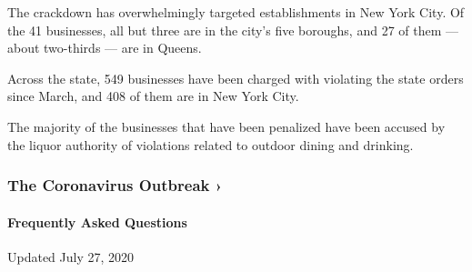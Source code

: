 The crackdown has overwhelmingly targeted establishments in New York
City. Of the 41 businesses, all but three are in the city's five
boroughs, and 27 of them --- about two-thirds --- are in Queens.

Across the state, 549 businesses have been charged with violating the
state orders since March, and 408 of them are in New York City.

The majority of the businesses that have been penalized have been
accused by the liquor authority of violations related to outdoor dining
and drinking.

\href{https://www.nytimes.com/news-event/coronavirus?action=click\&pgtype=Article\&state=default\&region=MAIN_CONTENT_3\&context=storylines_faq}{}

\hypertarget{the-coronavirus-outbreak-}{%
\subsubsection{The Coronavirus Outbreak
›}\label{the-coronavirus-outbreak-}}

\hypertarget{frequently-asked-questions}{%
\paragraph{Frequently Asked
Questions}\label{frequently-asked-questions}}

Updated July 27, 2020

